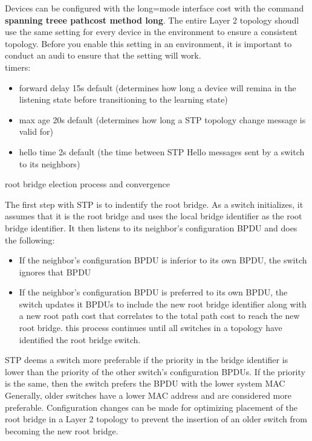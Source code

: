 \documentclass{article}
\begin{document}
Devices can be configured with the long=mode interface cost with the command \textbf{spanning treee pathcost method long}. The entire Layer 2 topology shoudl use the same setting for every device in the environment to ensure a consistent topology. Before you enable this setting in an environment, it is important to conduct an audi to ensure that the setting will work.\\

timers:
	\begin{itemize}
		\item forward delay 15s default (determines how long a device will remina in the listening state before transitioning to the learning state)
		\item max age 20s default (determines how long a STP topology change message is valid for)
		\item hello time 2s default (the time between STP Hello messages sent by a switch to its neighbors)
	\end{itemize}

root bridge election process and convergence

The first step with STP is to indentify the root bridge. As a switch initializes, it assumes that it is the root bridge and uses the local bridge identifier as the root bridge identifier. It then listens to its neighbor's configuration BPDU and does the following:
	\begin{itemize}
		\item If the neighbor's configuration BPDU is inferior to its own BPDU, the switch ignores that BPDU
		\item If the neighbor's configuration BPDU is preferred to its own BPDU, the switch updates it BPDUs to include the new root bridge identifier along with a new root path cost that correlates to the total path cost to reach the new root bridge. this process continues until all switches in a topology have identified the root bridge switch.
	\end{itemize}

STP deems a switch more preferable if the priority in the bridge identifier is lower than the priority of the other switch's configuration BPDUs. If the priority is the same, then the switch prefers the BPDU with the lower system MAC\\

Generally, older switches have a lower MAC address and are considered more preferable. Configuration changes can be made for optimizing placement of the root bridge in a Layer 2 topology to prevent the insertion of an older switch from becoming the new root bridge.\\
\end{document}
